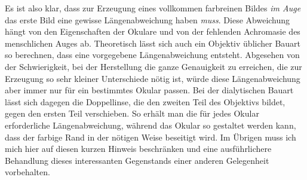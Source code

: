Es ist also klar, dass zur Erzeugung eines vollkommen farbreinen Bildes \textit{im Auge} das erste Bild eine gewisse Längenabweichung haben \textit{muss}. Diese Abweichung hängt von den Eigenschaften der Okulare und von der fehlenden Achromasie des menschlichen Auges ab. Theoretisch lässt sich auch ein Objektiv üblicher Bauart so berechnen, dass eine vorgegebene Längenabweichung entsteht. Abgesehen von der Schwierigkeit, bei der Herstellung die ganze
Genauigkeit zu erreichen, die zur Erzeugung so sehr kleiner Unterschiede nötig ist, würde diese Längenabweichung aber immer nur für ein bestimmtes Okular passen. Bei der dialytischen Bauart lässt sich dagegen die Doppellinse, die den zweiten Teil des Objektivs bildet, gegen den ersten Teil verschieben. So erhält man die für jedes Okular erforderliche Längenabweichung, während das Okular so gestaltet werden kann, dass der farbige Rand in der nötigen Weise beseitigt wird. Im Übrigen muss ich mich hier auf diesen kurzen Hinweis beschränken und eine ausführlichere Behandlung dieses interessanten Gegenstands einer anderen Gelegenheit vorbehalten.


